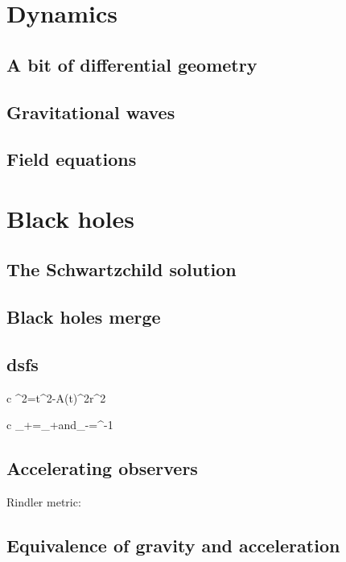 \documentclass[11pt,oneside%
]{memoir}
\newenvironment{eqna}{\begin{IEEEeqnarray*}{c}}{\end{IEEEeqnarray*}\ignorespacesafterend}
\newcommand{\andd}{\qquad\textrm{and}\qquad}
\newcommand{\dd}{\mathrm{d}}
\begin{document}
\chapter{Dynamics}

\section{A bit of differential geometry}

\section{Gravitational waves}

\section{Field equations}

\chapter{Black holes}

\section{The Schwartzchild solution}

\section{Black holes merge}

\section{dsfs}

\begin{eqna}
\dd\tau^2=\dd t^2-A(t)^2\dd r^2
\end{eqna}

\begin{eqna}
\sigma_+\rightarrow\tilde{\sigma_+}=\eta\sigma_+\andd\sigma_-\rightarrow\tilde{\sigma_+}=\eta^{-1}\sigma
\end{eqna}

\section{Accelerating observers}

Rindler metric:



\section{Equivalence of gravity and acceleration}
\end{document}
